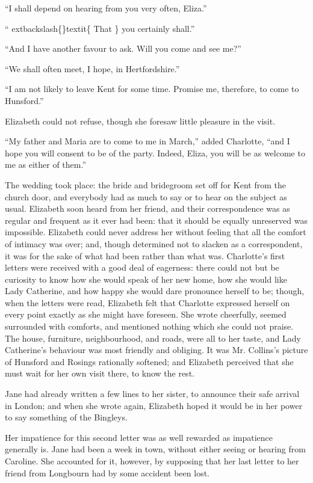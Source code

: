 \documentclass[10pt]{book}
\begin{document}
   “I shall depend on hearing from you very often, Eliza.”
  

   “
   	extbackslash\{\}textit\{
    That
   \}
   you certainly shall.”
  

   “And I have another favour to ask. Will you come and see me?”
  

   “We shall often meet, I hope, in Hertfordshire.”
  

   “I am not likely to leave Kent for some time. Promise me, therefore, to
come to Hunsford.”
  

   Elizabeth could not refuse, though she foresaw little pleasure in the
visit.
  

   “My father and Maria are to come to me in March,” added Charlotte, “and
I hope you will consent to be of the party. Indeed, Eliza, you will be
as welcome to me as either of them.”
  

   The wedding took place: the bride and bridegroom set off for Kent from
the church door, and everybody had as much to say or to hear on the
subject as usual. Elizabeth soon heard from her friend, and their
correspondence was as regular and frequent as it ever had been: that it
should be equally unreserved was impossible. Elizabeth could never
address her without feeling that all the comfort of intimacy was over;
and, though determined not to slacken as a correspondent, it was for the
sake of what had been rather than what was. Charlotte’s first letters
were received with a good deal of eagerness: there could not but be
curiosity to know how she would speak of her new home, how she would
like Lady Catherine, and how happy she would dare pronounce herself to
be; though, when the letters were read, Elizabeth felt that Charlotte
expressed herself on every point exactly as she might have foreseen. She
wrote cheerfully, seemed surrounded with comforts, and mentioned nothing
which she could not praise. The house, furniture, neighbourhood, and
roads, were all to her taste, and Lady Catherine’s behaviour was most
friendly and obliging. It was Mr. Collins’s picture of Hunsford and
Rosings rationally softened; and Elizabeth perceived that she must wait
for her own visit there, to know the rest.
  

   Jane had already written a few lines to her sister, to announce their
safe arrival in London; and when she wrote again, Elizabeth hoped it
would be in her power to say something of the Bingleys.
  

   Her impatience for this second letter was as well rewarded as impatience
generally is. Jane had been a week in town, without either seeing or
hearing from Caroline. She accounted for it, however, by supposing that
her last letter to her friend from Longbourn had by some accident been
lost.
  
\end{document}

